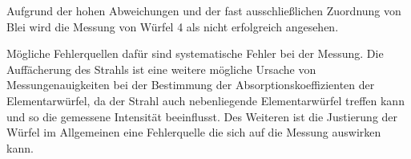 \noindent
Aufgrund der hohen Abweichungen und der fast ausschließlichen Zuordnung von Blei wird die Messung von Würfel 4 als nicht erfolgreich angesehen.

\noindent
Mögliche Fehlerquellen dafür sind systematische Fehler bei der Messung.
Die Auffächerung des Strahls ist eine weitere 
mögliche Ursache von Messungenauigkeiten bei der Bestimmung der Absorptionskoeffizienten der Elementarwürfel, da der Strahl auch nebenliegende
Elementarwürfel treffen kann und so die gemessene Intensität beeinflusst.
Des Weiteren ist die Justierung der Würfel im Allgemeinen eine Fehlerquelle die sich auf die Messung auswirken kann.